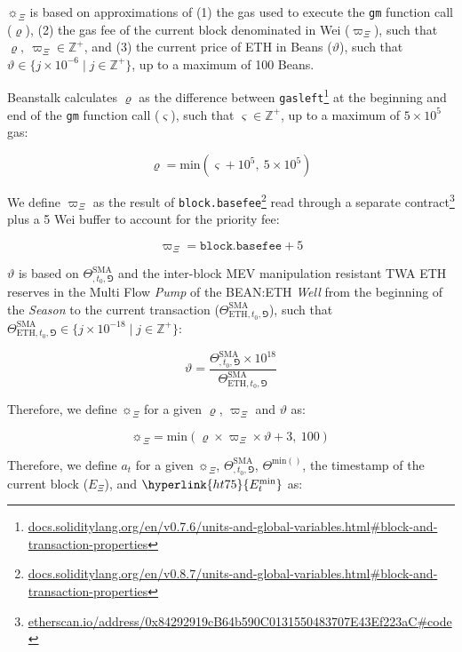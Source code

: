 \documentclass[tikz]{article}
\newcommand{\code}[1]{\texttt{#1}}
\newcommand{\term}[1]{\textsl{#1}}
\newcommand{\fref}[1]{\footnote{\href{http://#1}{#1}}}
\newcommand{\bean}{} %
\begin{document}
$\sun_{\Xi}$ is based on approximations of (1) the gas used to execute the \code{gm} function call ($\varrho$), (2) the gas fee of the current block denominated in Wei ($\varpi_\Xi$), such that $\varrho,\ \varpi_\Xi \in \mathbb{Z}^{+}$, and (3) the current price of ETH in Beans ($\vartheta$), such that $\vartheta \in \{j \times 10^{-6} \mid j \in \mathbb{Z}^{+} \}$, up to a maximum of 100 Beans.

Beanstalk calculates $\varrho$ as the difference between \code{gasleft}\fref{docs.soliditylang.org/en/v0.7.6/units-and-global-variables.html\#block-and-transaction-properties} at the beginning and end of the \code{gm} function call ($\varsigma$), such that $\varsigma \in \mathbb{Z}^{+}$, up to a maximum of $5 \times 10^5$ gas:

    $$
        \varrho = \text{min}(\varsigma + 10^5,\ 5 \times 10^5)
    $$

We define $\varpi_\Xi$ as the result of \code{block.basefee}\fref{docs.soliditylang.org/en/v0.8.7/units-and-global-variables.html\#block-and-transaction-properties} read through a separate contract\fref{etherscan.io/address/0x84292919cB64b590C0131550483707E43Ef223aC\#code} plus a 5 Wei buffer to account for the priority fee:

    $$
        \varpi_\Xi = \code{block.basefee} + 5
    $$

$\vartheta$ is based on $\Theta^{\text{SMA}}_{\bean,t_0,\Game}$ and the inter-block MEV manipulation resistant TWA ETH reserves in the Multi Flow \term{Pump} of the BEAN:ETH \term{Well} from the beginning of the \term{Season} to the current transaction ($\Theta^{\text{SMA}}_{\text{ETH},t_0,\Game}$), such that $\Theta^{\text{SMA}}_{\text{ETH},t_0,\Game} \in \{j \times 10^{-18} \mid j \in \mathbb{Z}^{+} \}$:

    $$
        \vartheta = 
        \frac{\Theta^{\text{SMA}}_{\bean,t_0,\Game} \times 10^{18}}
            {\Theta^{\text{SMA}}_{\text{ETH},t_0,\Game}}
    $$

Therefore, we define $\sun_{\Xi}$ for a given $\varrho$, $\varpi_\Xi$ and $\vartheta$ as:

\vspace*{-3mm}

    $$
        \sun_{\Xi} = \text{min}(\varrho \times \varpi_\Xi \times \vartheta + 3,\ 100)
    $$

Therefore, we define $a_t$ for a given $\sun_{\Xi}$, $\Theta^{\text{SMA}}_{\bean,t_0,\Game}$, $\Theta^{\text{min}(\bean)}$, the timestamp of the current block ($E_\Xi$), and $\hyperlink{ht75}{E_{t}^{\text{min}}}$ as:
\vspace*{-4mm}
\end{document}
